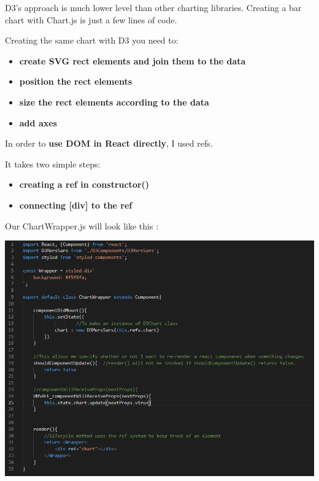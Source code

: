 D3’s approach is much lower level than other charting libraries. Creating a bar chart with Chart.js is just a few lines of code.

Creating the same chart with D3 you need to:

\begin{itemize}

\item \textbf{create SVG rect elements and join them to the data}
\item \textbf{position the rect elements}
\item \textbf{size the rect elements according to the data}
\item \textbf{add axes}

\end{itemize}


In order to \textbf{use DOM in React directly}, I used refs. 

It takes two simple steps:

\begin{itemize}

\item \textbf{creating a ref in constructor()}
\item \textbf{connecting [div] to the ref}

\end{itemize}

Our ChartWrapper.js will look like this :

\begin{center}    
      \includegraphics[scale=0.6]{img/D3Ref.PNG}
\end{center}

